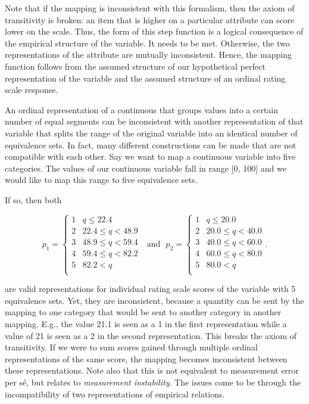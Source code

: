 \documentclass[utf8]{FrontiersinVancouver}
\begin{document}
Note that if the mapping is inconsistent with this formalism, then the axiom of transitivity is broken: an item that is higher on a particular attribute can score lower on the scale. Thus, the form of this step function is a logical consequence of the empirical structure of the variable. It needs to be met. Otherwise, the two representations of the attribute are mutually inconsistent. Hence, the mapping function follows from the assumed structure of our hypothetical perfect representation of the variable and the assumed structure of an ordinal rating scale response. 

An ordinal representation of a continuous that groups values into a certain number of equal segments can be inconsistent with another representation of that variable that splits the range of the original variable into an identical number of equivalence sets. In fact, many different constructions can be made that are not compatible with each other. Say we want to map a continuous variable into five categories. The values of our continuous variable fall in range [0, 100] and we would like to map this range to five equivalence sets.

If so, then both

\[
p_{1} = 
\begin{cases} 
    1 & q \leq 22.4\\
    2 & 22.4 \leq q < 48.9\\
    3 & 48.9 \leq q < 59.4\\
    4 & 59.4 \leq q < 82.2\\    
    5 & 82.2 < q\\
\end{cases}
\ \ \ \text{and}\ \ \ 
p_{2} =
\begin{cases} 
    1 & q \leq 20.0\\
    2 & 20.0 \leq q < 40.0\\
    3 & 40.0 \leq q < 60.0\\
    4 & 60.0 \leq q < 80.0\\    
    5 & 80.0 < q\\
\end{cases}.
\]

are valid representations for individual rating scale scores of the variable with 5 equivalence sets. Yet, they are inconsistent, because a quantity can be sent by the mapping to one category that would be sent to another category in another mapping. E.g., the value 21.1 is seen as a 1 in the first representation while a value of 21 is seen as a 2 in the second representation. This breaks the axiom of transitivity. If we were to sum scores gained through multiple ordinal representations of the same score, the mapping becomes inconsistent between these representations. Note also that this is not equivalent to measurement error per sé, but relates to \textit{measurement instability}. The issues come to be through the incompatibility of two representations of empirical relations.
\end{document}
